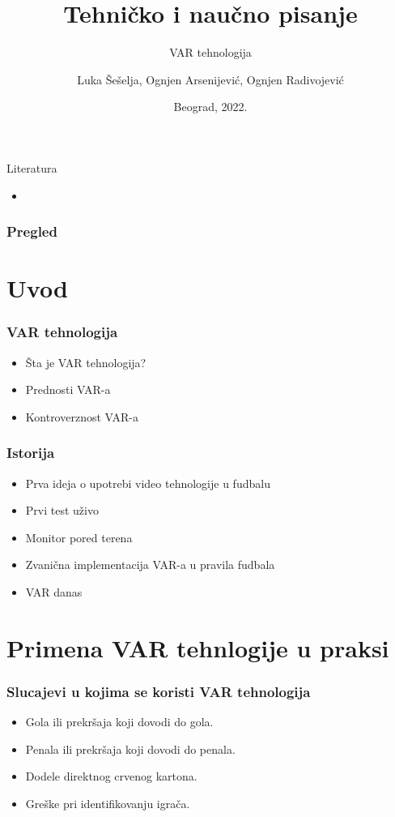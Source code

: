 \documentclass{beamer}
\title{Tehničko i naučno pisanje}
\subtitle{VAR tehnologija}
\author{Luka Šešelja, Ognjen Arsenijević, Ognjen Radivojević}
\institute{Matematički fakultet\\Univerzitet u Beogradu}
\date{\footnotesize{Beograd, 2022.}}
\begin{document}
\begin{frame}
\titlepage
\end{frame}

\begin{frame}[fragile]{Literatura}
    \begin{itemize}
        \item 
    \end{itemize}
\end{frame}

\begin{frame}
  \frametitle{Pregled}
  \tableofcontents
\end{frame}

\section{Uvod}

\begin{frame}
  \frametitle{VAR tehnologija}
  \begin{itemize}
    \item Šta je VAR tehnologija?
    \item Prednosti VAR-a
    \item Kontroverznost VAR-a
  \end{itemize}
\end{frame}

\begin{frame}
  \frametitle{Istorija}
  \begin{itemize}
    \item Prva ideja o upotrebi video tehnologije u fudbalu
    \item Prvi test uživo
    \item Monitor pored terena
    \item Zvanična implementacija VAR-a u pravila fudbala
    \item VAR danas
  \end{itemize}
\end{frame}

\section{Primena VAR tehnlogije u praksi}

\begin{frame}
  \frametitle{Slucajevi u kojima se koristi VAR tehnologija}
  \begin{itemize}
    \item Gola ili prekršaja koji dovodi do gola.
    \item Penala ili prekršaja koji dovodi do penala.
    \item Dodele direktnog crvenog kartona.
    \item Greške pri identifikovanju igrača.
  \end{itemize}
\end{frame}
\end{document}
